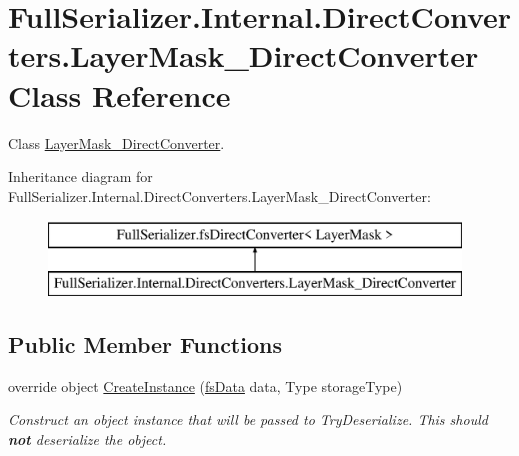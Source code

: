 \hypertarget{class_full_serializer_1_1_internal_1_1_direct_converters_1_1_layer_mask___direct_converter}{}\section{Full\+Serializer.\+Internal.\+Direct\+Converters.\+Layer\+Mask\+\_\+\+Direct\+Converter Class Reference}
\label{class_full_serializer_1_1_internal_1_1_direct_converters_1_1_layer_mask___direct_converter}


Class \hyperlink{class_full_serializer_1_1_internal_1_1_direct_converters_1_1_layer_mask___direct_converter}{Layer\+Mask\+\_\+\+Direct\+Converter}.  


Inheritance diagram for Full\+Serializer.\+Internal.\+Direct\+Converters.\+Layer\+Mask\+\_\+\+Direct\+Converter\+:\begin{figure}[H]
\begin{center}
\leavevmode
\includegraphics[height=2.000000cm]{class_full_serializer_1_1_internal_1_1_direct_converters_1_1_layer_mask___direct_converter}
\end{center}
\end{figure}
\subsection*{Public Member Functions}
\begin{DoxyCompactItemize}
\item 
override object \hyperlink{class_full_serializer_1_1_internal_1_1_direct_converters_1_1_layer_mask___direct_converter_a137b60e8c056f96e17449e04ad563f67}{Create\+Instance} (\hyperlink{class_full_serializer_1_1fs_data}{fs\+Data} data, Type storage\+Type)
\begin{DoxyCompactList}\small\item\em Construct an object instance that will be passed to Try\+Deserialize. This should {\bfseries not} deserialize the object. \end{DoxyCompactList}\end{DoxyCompactItemize}
